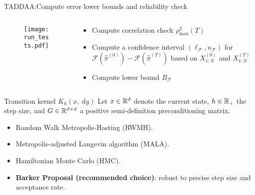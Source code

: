 \documentclass[10pt,xcolor=table]{beamer}
\begin{document}
\begin{frame}{TADDAA:Compute error lower bounds and reliability check}
\begin{columns}[T]
  \begin{column}{0.5\linewidth}
\begin{figure}[p]
    \centering 
    \texttt{[image: run\_tests.pdf]}
\end{figure}
  \end{column}
  \begin{column}{0.5 \linewidth}
        \begin{itemize}
                \item Compute correlation check $\rho_{\max }^2(T)$
                \item Compute a confidence interval $(\ell_{\mathcal{F}}, u_{\mathcal{F}})$ for $\mathcal{F}(\hat{\pi}^{(0)})-\mathcal{F}(\hat{\pi}^{(T)})$ based on $X_{1: N}^{(0)}$ and $X_{1: N}^{(T)}$
                \item Compute lower bound $B_{\mathcal{F}}$
        \end{itemize}
  \end{column}
  \end{columns}
\end{frame}


\begin{frame}{Transition kernel $K_h(x, \mathrm{~d} y)$}
Let $x \in \mathbb{R}^{d}$ denote the current state, 
$h \in \mathbb{R}_{+}$ the step size, and $G \in \mathbb{R}^{d \times d}$ a positive semi-definition preconditioning matrix. 
\begin{itemize}
    \item Random Walk Metropolis-Hasting (RWMH). 
    \item Metropolis-adjusted Langevin algorithm (MALA).
    \item Hamiltonian Monte Carlo (HMC).
    \item \textbf{Barker Proposal (recommended choice)}: robust to precise step size and acceptance rate. 
\end{itemize}
\end{frame}
\end{document}
